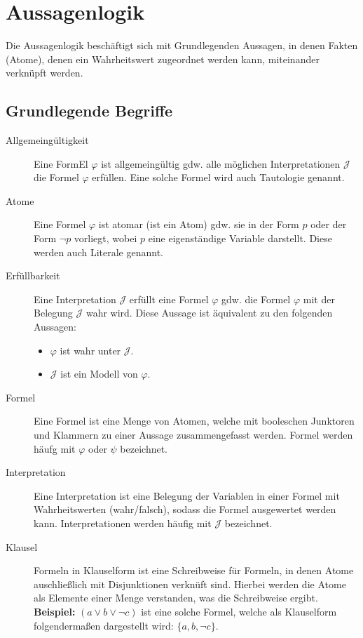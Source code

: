 \chapter{Aussagenlogik}
    Die Aussagenlogik beschäftigt sich mit Grundlegenden Aussagen, in denen Fakten (Atome), denen ein Wahrheitswert zugeordnet werden kann, miteinander verknüpft werden.

    \section{Grundlegende Begriffe}
        \begin{description}
            \item[Allgemeingültigkeit] Eine FormEl $ \varphi $ ist allgemeingültig gdw. alle möglichen Interpretationen $ \mathcal{J} $ die Formel $ \varphi $ erfüllen. Eine solche Formel wird auch Tautologie genannt.
            \item[Atome] Eine Formel $ \varphi $ ist atomar (ist ein Atom) gdw. sie in der Form $ p $ oder der Form $ \lnot p $ vorliegt, wobei $ p $ eine eigenständige Variable darstellt. Diese werden auch Literale genannt.
            \item[Erfüllbarkeit] Eine Interpretation $ \mathcal{J} $ erfüllt eine Formel $ \varphi $ gdw. die Formel $ \varphi $ mit der Belegung $ \mathcal{J} $ wahr wird. Diese Aussage ist äquivalent zu den folgenden Aussagen:
                \begin{itemize}
                    \item $ \varphi $ ist wahr unter $ \mathcal{J} $.
                    \item $ \mathcal{J} $ ist ein Modell von $ \varphi $.
                \end{itemize}
            \item[Formel] Eine Formel ist eine Menge von Atomen, welche mit booleschen Junktoren und Klammern zu einer Aussage zusammengefasst werden. Formel werden häufg mit $ \varphi $ oder $ \psi $ bezeichnet.
            \item[Interpretation] Eine Interpretation ist eine Belegung der Variablen in einer Formel mit Wahrheitswerten (wahr/falsch), sodass die Formel ausgewertet werden kann. Interpretationen werden häufig mit $ \mathcal{J} $ bezeichnet.
            \item[Klausel] Formeln in Klauselform ist eine Schreibweise für Formeln, in denen Atome auschließlich mit Disjunktionen verknüft sind. Hierbei werden die Atome als Elemente einer Menge verstanden, was die Schreibweise ergibt. \\ \textbf{Beispiel:} $ (a \lor b \lor \lnot c) $ ist eine solche Formel, welche als Klauselform folgendermaßen dargestellt wird: $ \{ a, b, \lnot c \} $.

\end{description}
